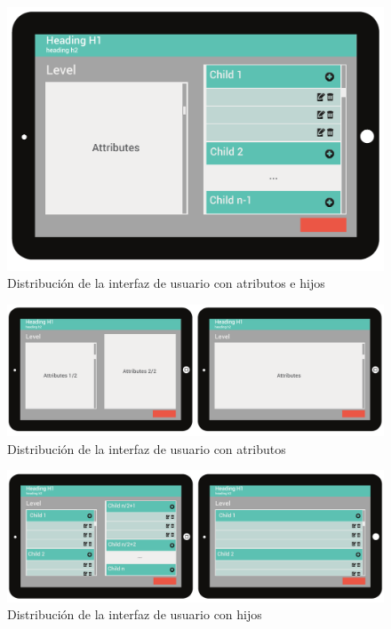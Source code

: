 \begin{figure}[ht]
\centering
\includegraphics[scale=0.6]{./imgs/esquemas/layoutAttributesChildren.pdf}
\caption{Distribución de la interfaz de usuario con atributos e hijos}
\label{fig:layoutAC}
\end{figure}

\begin{figure}[ht]
\centering
\includegraphics[scale=0.45]{./imgs/esquemas/layoutAttributes.pdf}
\caption{Distribución de la interfaz de usuario con atributos}
\label{fig:layoutA}
\end{figure}

\begin{figure}[ht]
\centering
\includegraphics[scale=0.45]{./imgs/esquemas/layoutChildren.pdf}
\caption{Distribución de la interfaz de usuario con hijos}
\label{fig:layoutC}
\end{figure}

